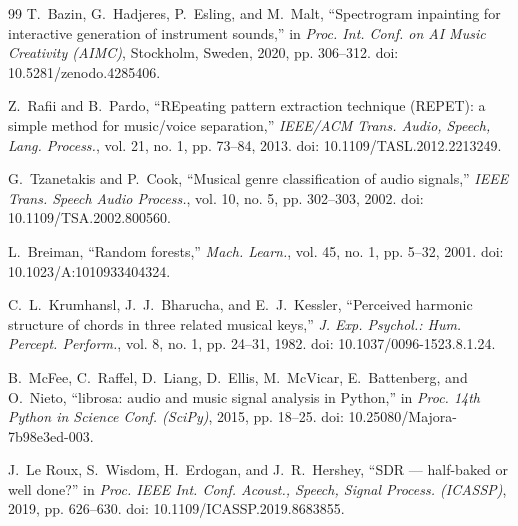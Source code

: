 \documentclass[conference]{IEEEtran}
\begin{document}
\begin{thebibliography}{99}
T.~Bazin, G.~Hadjeres, P.~Esling, and M.~Malt, ``Spectrogram inpainting for
interactive generation of instrument sounds,'' in \emph{Proc. Int. Conf. on AI
Music Creativity (AIMC)}, Stockholm, Sweden, 2020, pp. 306--312.
doi: 10.5281/zenodo.4285406.

Z.~Rafii and B.~Pardo, ``REpeating pattern extraction technique (REPET): a
simple method for music/voice separation,'' \emph{IEEE/ACM Trans. Audio,
Speech, Lang. Process.}, vol. 21, no. 1, pp. 73--84, 2013.
doi: 10.1109/TASL.2012.2213249.

G.~Tzanetakis and P.~Cook, ``Musical genre classification of audio signals,''
\emph{IEEE Trans. Speech Audio Process.}, vol. 10, no. 5, pp. 302--303, 2002.
doi: 10.1109/TSA.2002.800560.

L.~Breiman, ``Random forests,'' \emph{Mach. Learn.}, vol. 45, no. 1, pp. 5--32,
2001. doi: 10.1023/A:1010933404324.

C.~L.~Krumhansl, J.~J.~Bharucha, and E.~J.~Kessler, ``Perceived harmonic
structure of chords in three related musical keys,'' \emph{J. Exp. Psychol.:
Hum. Percept. Perform.}, vol. 8, no. 1, pp. 24--31, 1982.
doi: 10.1037/0096-1523.8.1.24.

B.~McFee, C.~Raffel, D.~Liang, D.~Ellis, M.~McVicar, E.~Battenberg, and
O.~Nieto, ``librosa: audio and music signal analysis in Python,'' in
\emph{Proc. 14th Python in Science Conf. (SciPy)}, 2015, pp. 18--25.
doi: 10.25080/Majora-7b98e3ed-003.

J.~Le Roux, S.~Wisdom, H.~Erdogan, and J.~R.~Hershey, ``SDR --- half-baked or
well done?'' in \emph{Proc. IEEE Int. Conf. Acoust., Speech, Signal Process.
(ICASSP)}, 2019, pp. 626--630. doi: 10.1109/ICASSP.2019.8683855.

\end{thebibliography}
\end{document}
